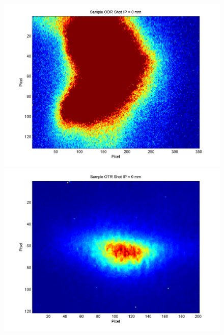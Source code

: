 \documentclass[12pt]{article}
\begin{document}
\begin{figure}
\begin{center}
\includegraphics[scale=0.5]{Figures/Sample_ODR_0.PNG}
\includegraphics[scale=0.5]{Figures/Sample_OTR_0.PNG}
\caption{}
\end{center}
\end{figure}
\end{document}
